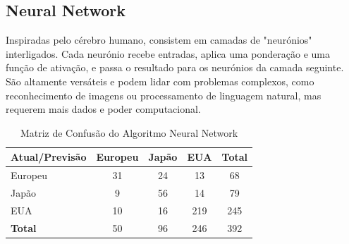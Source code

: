 \documentclass[conference]{IEEEtran}
\begin{document}
\subsection{Neural Network}
Inspiradas pelo cérebro humano, consistem em camadas de "neurónios" interligados. Cada neurónio recebe entradas,
aplica uma ponderação e uma função de ativação, e passa o resultado para os neurónios da camada seguinte. São altamente versáteis
e podem lidar com problemas complexos, como reconhecimento de imagens ou processamento de linguagem natural, mas requerem mais dados
e poder computacional.
\begin{table}[!ht]
	\centering
	\begin{tabular}{lcccc}
		\toprule
		\textbf{Atual/Previsão} & \textbf{Europeu} & \textbf{Japão} & \textbf{EUA} & \textbf{Total} \\
		\midrule
		Europeu                 & 31               & 24             & 13           & 68             \\
		Japão                   & 9                & 56             & 14           & 79             \\
		EUA                     & 10               & 16             & 219          & 245            \\
		\midrule
		\textbf{Total}          & 50               & 96             & 246          & 392            \\
		\bottomrule
	\end{tabular}
	\label{tab:conf_matrix_neural}
	\caption{Matriz de Confusão do Algoritmo Neural Network}
\end{table}
\newpage

\end{document}
